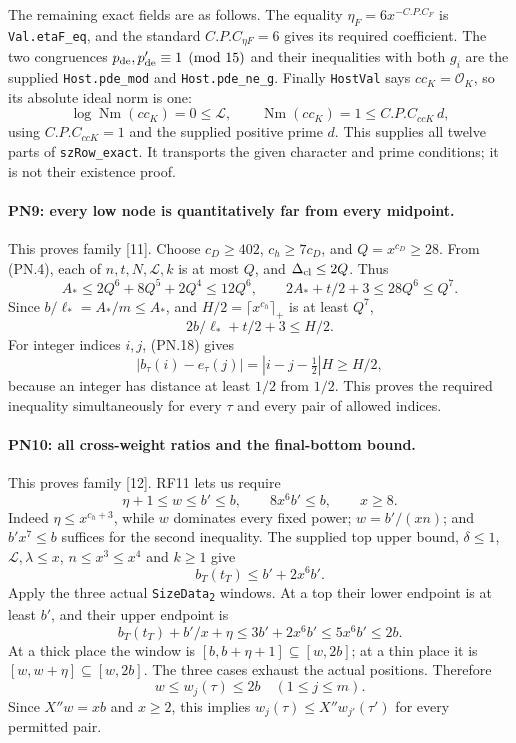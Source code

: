 \documentclass[11pt,a4paper]{article}
\numberwithin{equation}{section}
\theoremstyle{remark}\newtheorem{remark}[theorem]{Remark}
\begin{document}
The remaining exact fields are as follows. The equality
$\eta_F=6x^{-C.P.C_F}$ is \texttt{Val.etaF\_\allowbreak eq}, and the standard
$C.P.C_{\eta F}=6$ gives its required coefficient. The two congruences
$p_{\rm de},p'_{\rm de}\equiv1\pmod{15}$ and their inequalities with
both $g_i$ are the supplied \texttt{Host.pde\_\allowbreak mod} and
\texttt{Host.pde\_\allowbreak ne\_\allowbreak g}. Finally \texttt{HostVal} says
$cc_K=\mathcal O_K$, so its absolute ideal norm is one:
\[
       \log\operatorname{Nm}(cc_K)=0\leq\mathcal L,
       \qquad \operatorname{Nm}(cc_K)=1\leq C.P.C_{ccK}\,d,
                                                               \tag{PN.21}
\]
using $C.P.C_{ccK}=1$ and the supplied positive prime $d$.
This supplies all twelve parts of \texttt{szRow\_\allowbreak exact}. It transports
the given character and prime conditions; it is not their existence proof.

\paragraph{PN9: every low node is quantitatively far from every midpoint.}
This proves family [11]. Choose $c_D\geq402$, $c_h\geq7c_D$,
and $Q=x^{c_D}\geq28$. From (PN.4), each of $n,t,N,\mathcal L,k$
is at most $Q$, and $\Delta_{\rm cl}\leq2Q$. Thus
\[
 A_*\leq2Q^6+8Q^5+2Q^4\leq12Q^6,
 \qquad 2A_*+t/2+3\leq28Q^6\leq Q^7.                   \tag{PN.22}
\]
Since $b/\ell_*=A_*/m\leq A_*$, and $H/2=\lceil x^{c_h}\rceil_+$
is at least $Q^7$,
\[
                 2b/\ell_*+t/2+3\leq H/2.
\]
For integer indices $i,j$, (PN.18) gives
\[
 |b_\tau(i)-e_\tau(j)|=|i-j-\tfrac12|H\geq H/2,
                                                               \tag{PN.23}
\]
because an integer has distance at least $1/2$ from $1/2$.
This proves the required inequality simultaneously for every
$\tau$ and every pair of allowed indices.

\paragraph{PN10: all cross-weight ratios and the final-bottom bound.}
This proves family [12]. RF11 lets us require
\[
               \eta+1\leq w\leq b'\leq b,
               \qquad 8x^6b'\leq b,\qquad x\geq8.        \tag{PN.24}
\]
Indeed $\eta\leq x^{c_h+3}$, while $w$ dominates every fixed
power; $w=b'/(xn)$; and $b'x^7\leq b$ suffices for the second
inequality. The supplied top upper bound, $\delta\leq1$,
$\mathcal L,\lambda\leq x$, $n\leq x^3\leq x^4$ and $k\geq1$
give
\[
              b_T(t_T)\leq b'+2x^6b'.                       \tag{PN.25}
\]
Apply the three actual \texttt{SizeData\textsubscript{2}} windows.
At a top their lower endpoint is at least $b'$, and their upper
endpoint is
\[
 b_T(t_T)+b'/x+\eta\leq3b'+2x^6b'\leq5x^6b'\leq2b.
\]
At a thick place the window is $[b,b+\eta+1]\subseteq[w,2b]$;
at a thin place it is $[w,w+\eta]\subseteq[w,2b]$.
The three cases exhaust the actual positions. Therefore
\[
          w\leq w_j(\tau)\leq2b
                  \quad(1\leq j\leq m).                   \tag{PN.26}
\]
Since $X''w=xb$ and $x\geq2$, this implies
$w_j(\tau)\leq X''w_{j'}(\tau')$ for every permitted pair.
\end{document}
